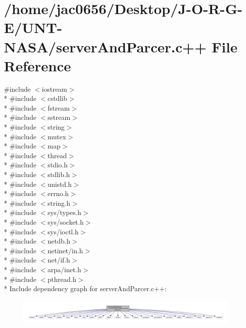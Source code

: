 \hypertarget{serverAndParcer_8c_09_09}{}\section{/home/jac0656/\+Desktop/\+J-\/\+O-\/\+R-\/\+G-\/\+E/\+U\+N\+T-\/\+N\+A\+S\+A/server\+And\+Parcer.c++ File Reference}
\label{serverAndParcer_8c_09_09}
{\ttfamily \#include $<$iostream$>$}\\*
{\ttfamily \#include $<$cstdlib$>$}\\*
{\ttfamily \#include $<$fstream$>$}\\*
{\ttfamily \#include $<$sstream$>$}\\*
{\ttfamily \#include $<$string$>$}\\*
{\ttfamily \#include $<$mutex$>$}\\*
{\ttfamily \#include $<$map$>$}\\*
{\ttfamily \#include $<$thread$>$}\\*
{\ttfamily \#include $<$stdio.\+h$>$}\\*
{\ttfamily \#include $<$stdlib.\+h$>$}\\*
{\ttfamily \#include $<$unistd.\+h$>$}\\*
{\ttfamily \#include $<$errno.\+h$>$}\\*
{\ttfamily \#include $<$string.\+h$>$}\\*
{\ttfamily \#include $<$sys/types.\+h$>$}\\*
{\ttfamily \#include $<$sys/socket.\+h$>$}\\*
{\ttfamily \#include $<$sys/ioctl.\+h$>$}\\*
{\ttfamily \#include $<$netdb.\+h$>$}\\*
{\ttfamily \#include $<$netinet/in.\+h$>$}\\*
{\ttfamily \#include $<$net/if.\+h$>$}\\*
{\ttfamily \#include $<$arpa/inet.\+h$>$}\\*
{\ttfamily \#include $<$pthread.\+h$>$}\\*
Include dependency graph for server\+And\+Parcer.\+c++\+:
\nopagebreak
\begin{figure}[H]
\begin{center}
\leavevmode
\includegraphics[width=350pt]{serverAndParcer_8c_09_09__incl}
\end{center}
\end{figure}
